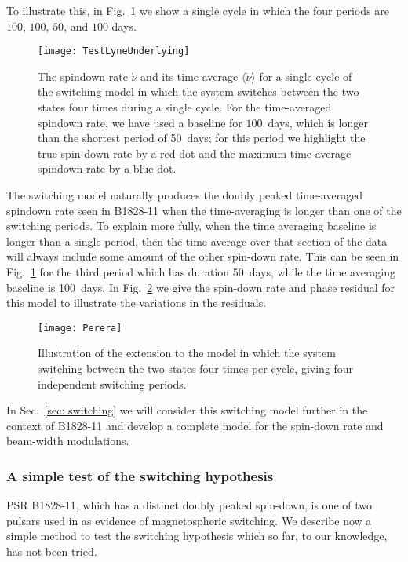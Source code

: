 To illustrate this, in Fig.~\ref{fig: test lyne underlying} we show a single
cycle in which the four periods are $100$, $100$, $50$, and $100$ days.
\begin{figure}[htb]
    \centering
    \texttt{[image: TestLyneUnderlying]}
    \caption{The spindown rate $\dot{\nu}$ and its time-average $\langle\dot{\nu}\rangle$
    for a single cycle of the \citet{Perera2014} switching model in which the
    system switches between the two states four times during a single cycle.
    For the time-averaged spindown rate, we have used a baseline for $100$~days,
    which is longer than the shortest period of 50~days; for this period we
    highlight the true spin-down rate by a red dot and the maximum time-average
    spindown rate by a blue dot.}
    \label{fig: test lyne underlying}
\end{figure}

The \citet{Perera2014} switching model naturally produces the doubly peaked
time-averaged spindown rate seen in B1828-11 when the time-averaging is longer
than one of the switching periods. To explain more fully, when the time
averaging baseline is longer than a single period, then the time-average over
that section of the data will always include some amount of the other spin-down
rate. This can be seen in Fig.~\ref{fig: test lyne underlying} for the third
period which has duration 50~days, while the time averaging baseline is
100~days. In Fig.~\ref{fig: perera example} we give the spin-down rate and
phase residual for this model to illustrate the variations in the residuals.
\begin{figure}[htb]
    \centering
    \texttt{[image: Perera]}
    \caption{Illustration of the \citet{Perera2014} extension to the
    \citet{Lyne2010} model in which the system switching between the two states
    four times per cycle, giving four independent switching periods.}
    \label{fig: perera example}
\end{figure}

In Sec.~\ref{sec: switching} we will consider this switching
model further in the context of B1828-11 and develop a complete model for the
spin-down rate and beam-width modulations.

\subsubsection{A simple test of the switching hypothesis}
PSR B1828-11, which has a distinct doubly peaked spin-down, is one of two pulsars
used in \citet{Lyne2010} as evidence of magnetospheric switching. We describe now
a simple method to test the switching hypothesis which so far, to our knowledge,
has not been tried.

